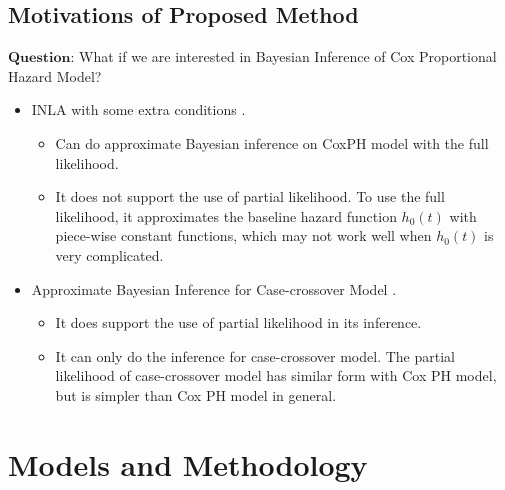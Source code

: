 \documentclass{beamer} %
\begin{document}
\subsection{Motivations of Proposed Method}
\begin{frame}
$\textbf{Question}$: What if we are interested in Bayesian Inference of Cox Proportional Hazard Model?
\begin{itemize}
\pause
\item INLA with some extra conditions \citep{inlacoxph}.
\begin{itemize}
\pause
\item Can do approximate Bayesian inference on CoxPH model with the full likelihood.
\pause
\item It does not support the use of partial likelihood. To use the full likelihood, it approximates the baseline hazard function $h_{0}(t)$ with piece-wise constant functions, which may not work well when $h_{0}(t)$ is very complicated.
\end{itemize}
\pause
\item Approximate Bayesian Inference for Case-crossover Model \citep{casecross}.
\begin{itemize}
\pause
\item It does support the use of partial likelihood in its inference.
\pause
\item It can only do the inference for case-crossover model. The partial likelihood of case-crossover model has similar form with Cox PH model, but is simpler than Cox PH model in general.
\end{itemize}
\end{itemize}
\end{frame}

\section{Models and Methodology}
\end{document}
